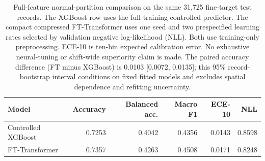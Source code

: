 \begin{table}[htbp]
\centering\footnotesize
\setlength{\tabcolsep}{2.3pt}
\caption{Full-feature normal-partition comparison on the same 31,725 fine-target test records. The XGBoost row uses the full-training controlled predictor. The compact compressed FT-Transformer uses one seed and two prespecified learning rates selected by validation negative log-likelihood (NLL). Both use training-only preprocessing. ECE-10 is ten-bin expected calibration error. No exhaustive neural-tuning or shift-wide superiority claim is made. The paired accuracy difference (FT minus XGBoost) is 0.0103 [0.0072, 0.0135]; this 95\% record-bootstrap interval conditions on fixed fitted models and excludes spatial dependence and refitting uncertainty.}\label{tab:supp-full-feature-neural}
\begin{tabular}{lrrrrr}
\toprule
Model & Accuracy & Balanced acc. & Macro F1 & ECE-10 & NLL \\
\midrule
Controlled XGBoost & 0.7253 & 0.4042 & 0.4356 & 0.0143 & 0.8598 \\
FT-Transformer & 0.7357 & 0.4263 & 0.4508 & 0.0171 & 0.8248 \\
\bottomrule
\end{tabular}
\end{table}
